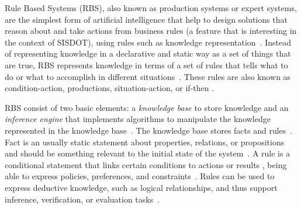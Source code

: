 
Rule Based Systems (RBS), also known as production systems or expert systems, are the 
simplest form of artificial intelligence that help to design solutions that reason about 
and take actions from business rules (a feature that is interesting in the context of SISDOT), using rules such as knowledge representation~\cite{grosan2011}. 
Instead of representing knowledge in a declarative and static way as a set of things that are true, 
RBS represents knowledge in terms of a set of rules that tells what to do or what to accomplish in different 
situations~\cite{grosan2011}. These rules are also known as condition-action, productions, situation-action, 
or if-then \cite{russell2010}.

RBS consist of two basic elements: a \emph{knowledge base} to store knowledge and an \emph{inference engine} that 
implements  algorithms to manipulate the knowledge represented in the knowledge base~\cite{grosan2011,lucas1991,gallacher1989}.
The knowledge base stores facts and rules~\cite{hayesRoth1985}. Fact is an usually static statement about properties, relations, 
or propositions~\cite{hayesRoth1985} and should be something relevant to the initial state of the system~\cite{grosan2011}. 
A rule is a conditional statement that links certain conditions to actions or results \cite{abraham2005}, being able to express 
policies, preferences, and constraints~\cite{gilman2015}. Rules can be used to express deductive knowledge, 
such as logical relationships, and thus support inference, verification, or evaluation tasks~\cite{hayesRoth1985}.

